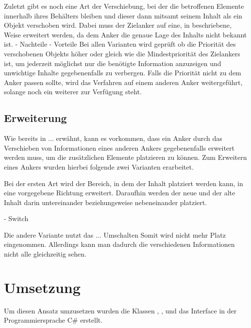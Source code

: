 			
			Zuletzt gibt es noch eine Art der Verschiebung, bei der die betroffenen Elemente innerhalb ihres Behälters bleiben und dieser dann mitsamt seinem Inhalt als ein Objekt verschoben wird. Dabei muss der Zielanker auf eine, in beschriebene, Weise erweitert werden, da dem Anker die genaue Lage des Inhalts nicht bekannt ist. - Nachteile - Vorteile 
			Bei allen Varianten wird geprüft ob die Priorität des verschobenen Objekts höher oder gleich wie die Mindestpriorität des Zielankers ist, um jederzeit möglichst nur die benötigte Information anzuzeigen und unwichtige Inhalte gegebenenfalls zu verbergen. Falls die Priorität nicht zu dem Anker passen sollte, wird das Verfahren auf einem anderen Anker weitergeführt, solange noch ein weiterer zur Verfügung steht.
			
		\subsection{Erweiterung}
			Wie bereits in ... erwähnt, kann es vorkommen, dass ein Anker durch das Verschieben von Informationen eines anderen Ankers gegebenenfalls erweitert werden muss, um die zusätzlichen Elemente platzieren zu können.
			Zum Erweitern eines Ankers wurden hierbei folgende zwei Varianten erarbeitet.
			
			Bei der ersten Art wird der Bereich, in dem der Inhalt platziert werden kann, in eine vorgegebene Richtung erweitert. Daraufhin werden der neue und der alte Inhalt darin untereinander beziehungsweise nebeneinander platziert.
			
			
			- Switch
			
			Die andere Variante nutzt das ... Umschalten
			Somit wird nicht mehr Platz eingenommen.
			Allerdings kann man dadurch die verschiedenen Informationen nicht alle gleichzeitig sehen.
			
			
			
			
	\section{Umsetzung}
		Um diesen Ansatz umzusetzen wurden die Klassen , , \linebreak{} und das Interface  in der Programmiersprache C\# erstellt. 
			
